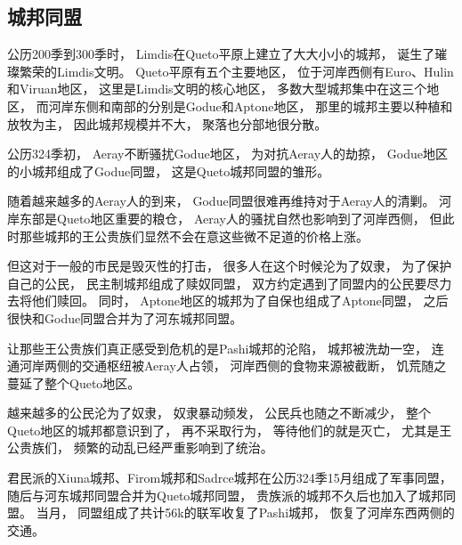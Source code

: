 \documentclass[UTF8,12pt,draft]{ctexbook}
\begin{document}
            \subsection{城邦同盟}
                公历200季到300季时，
                Limdis在Queto平原上建立了大大小小的城邦，
                诞生了璀璨繁荣的Limdis文明。
                Queto平原有五个主要地区，
                位于河岸西侧有Euro、Hulin和Viruan地区，
                这里是Limdis文明的核心地区，
                多数大型城邦集中在这三个地区，
                而河岸东侧和南部的分别是Godue和Aptone地区，
                那里的城邦主要以种植和放牧为主，
                因此城邦规模并不大，
                聚落也分部地很分散。
                
                公历324季初，
                Aeray不断骚扰Godue地区，
                为对抗Aeray人的劫掠，
                Godue地区的小城邦组成了Godue同盟，
                这是Queto城邦同盟的雏形。

                随着越来越多的Aeray人的到来，
                Godue同盟很难再维持对于Aeray人的清剿。
                河岸东部是Queto地区重要的粮仓，
                Aeray人的骚扰自然也影响到了河岸西侧，
                但此时那些城邦的王公贵族们显然不会在意这些微不足道的价格上涨。

                但这对于一般的市民是毁灭性的打击，
                很多人在这个时候沦为了奴隶，
                为了保护自己的公民，
                民主制城邦组成了赎奴同盟，
                双方约定遇到了同盟内的公民要尽力去将他们赎回。
                同时，
                Aptone地区的城邦为了自保也组成了Aptone同盟，
                之后很快和Godue同盟合并为了河东城邦同盟。

                让那些王公贵族们真正感受到危机的是Pashi城邦的沦陷，
                城邦被洗劫一空，
                连通河岸两侧的交通枢纽被Aeray人占领，
                河岸西侧的食物来源被截断，
                饥荒随之蔓延了整个Queto地区。

                越来越多的公民沦为了奴隶，
                奴隶暴动频发，
                公民兵也随之不断减少，
                整个Queto地区的城邦都意识到了，
                再不采取行为，
                等待他们的就是灭亡，
                尤其是王公贵族们，
                频繁的动乱已经严重影响到了统治。

                君民派的Xiuna城邦、Firom城邦和Sadrce城邦在公历324季15月组成了军事同盟，
                随后与河东城邦同盟合并为Queto城邦同盟，
                贵族派的城邦不久后也加入了城邦同盟。
                当月，
                同盟组成了共计56k的联军收复了Pashi城邦，
                恢复了河岸东西两侧的交通。
\end{document}
